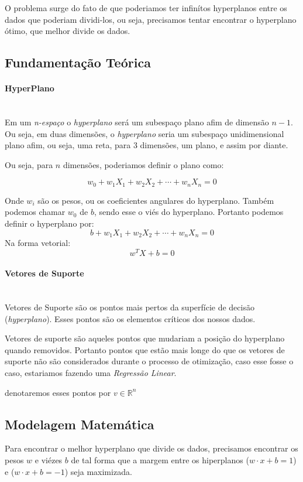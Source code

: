 \documentclass{article}
\begin{document}
O problema surge do fato de que poderiamos ter infinítos hyperplanos entre os dados que poderiam dividi-los, ou seja, precisamos tentar encontrar o hyperplano ótimo, que melhor divide os dados.

\subsection{Fundamentação Teórica}
\paragraph{HyperPlano} \hspace{0pt} \\

Em um \textit{n-espaço} o \textit{hyperplano} será um subespaço plano afim de dimensão \(n-1\). Ou seja, em duas dimensões, o \textit{hyperplano} seria um subespaço unidimensional plano afim, ou seja, uma reta, para 3 dimensões, um plano, e assim por diante.

Ou seja, para \(n\) dimensões, poderiamos definir o plano como:

\[w_0+w_1X_1+w_2X_2+\cdots+w_nX_n=0\]

Onde \(w_i\) são os pesos, ou os coeficientes angulares do hyperplano.
Também podemos chamar \(w_0\) de \(b\), sendo esse o viés do hyperplano.
Portanto podemos definir o hyperplano por:
\[b+w_1X_1+w_2X_2+\cdots+w_nX_n=0\]
Na forma vetorial:
\[w^TX+b=0\]

\paragraph{Vetores de Suporte} \hspace{0pt} \\

Vetores de Suporte são os pontos mais pertos da superfície de decisão (\textit{hyperplano}). Esses pontos são os elementos críticos dos nossos dados.

Vetores de suporte são aqueles pontos que mudariam a posição do hyperplano quando removidos.
Portanto pontos que estão mais longe do que os vetores de suporte não são considerados durante o processo de otimização, caso esse fosse o caso, estariamos fazendo uma \textit{Regressão Linear}.

denotaremos esses pontos por \(v\in\mathbb{R}^{n}\)

\subsection{Modelagem Matemática}
Para encontrar o melhor hyperplano que divide os dados, precisamos encontrar os pesos \(w\) e viézes \(b\) de tal forma que a margem entre os hiperplanos (\(w\cdot x+b=1\)) e (\(w\cdot x+b = -1\)) seja maximizada.
\end{document}
